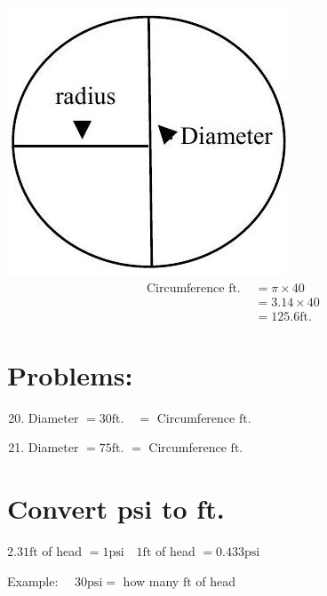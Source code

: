 \documentclass[10pt]{article}
\begin{document}
\includegraphics[max width=\textwidth]{2022_09_16_0c6b804a9b26a8df4e8fg-03}
$$
\begin{aligned}
\text { Circumference ft. } &=\pi \times 40 \\
&=3.14 \times 40 \\
&=125.6 \mathrm{ft} .
\end{aligned}
$$

\section{Problems:}
\begin{enumerate}
  \setcounter{enumi}{19}
  \item Diameter $=30 \mathrm{ft} . \quad=$ Circumference $\mathrm{ft}$.

  \item Diameter $=75 \mathrm{ft}$. $=$ Circumference $\mathrm{ft}$.

\end{enumerate}
\section{Convert psi to ft.}
$2.31 \mathrm{ft}$ of head $=1 \mathrm{psi} \quad 1 \mathrm{ft}$ of head $=0.433 \mathrm{psi}$

Example: $\quad 30 \mathrm{psi}=$ how many $\mathrm{ft}$ of head
\end{document}
